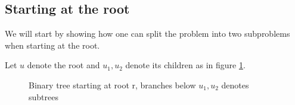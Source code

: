 \subsection*{Starting at the root}
We will start by showing how one can split the problem into two subproblems when starting at the root.

Let $u$ denote the root and $u_1, u_2$ denote its children as in figure \ref{root_case}.
\begin{figure}[H]
\begin{center}
\end{center}
\caption{Binary tree starting at root r, branches below $u_1, u_2$ denotes subtrees}
\label{root_case}
\end{figure}

